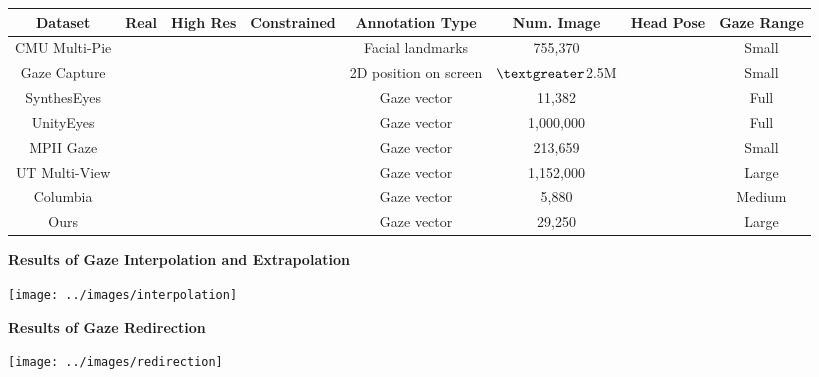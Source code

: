 \documentclass[landscape,a0paper,fontscale=0.292]{baposter}
\newcommand{\ncmark}{\ding{51}}
\newcommand{\nxmark}{\ding{55}}
\begin{document}
\begin{poster}
{\begin{center}
\begin{tabular}{cccccccc}
\toprule
Dataset & Real& High Res& Constrained & Annotation Type & Num. Image &Head Pose &Gaze Range\\
\hline\hline
CMU Multi-Pie &\ncmark&\nxmark&\ncmark &Facial landmarks&755,370 &\ncmark &Small\\
Gaze Capture &\ncmark &\nxmark &\nxmark &2D position on screen &$\textgreater$2.5M &\nxmark &Small\\
SynthesEyes &\nxmark &\ncmark &\nxmark &Gaze vector & 11,382 &\ncmark & Full\\
UnityEyes &\nxmark &\ncmark &\nxmark &Gaze vector &1,000,000 &\ncmark&Full\\
MPII Gaze &\ncmark &\nxmark &\nxmark &Gaze vector &213,659 &\ncmark &Small\\
UT Multi-View &\ncmark &\nxmark &\ncmark &Gaze vector&1,152,000 &\ncmark &Large\\
Columbia &\ncmark &\ncmark &\ncmark &Gaze vector& 5,880 &\ncmark &Medium\\
\hline\hline
Ours&\ncmark &\ncmark &\ncmark &Gaze vector & 29,250 &\ncmark &Large\\
\bottomrule
\end{tabular}
\end{center}
\hfill

\begin{minipage}[t]{0.5\textwidth}
    \textbf{\color{blue}Results of Gaze Interpolation and Extrapolation} 
    \vspace{-0.2em}
    \begin{center}
        \texttt{[image: ../images/interpolation]}
    \end{center}
\end{minipage}
\hfill%
\begin{minipage}[t]{0.5\textwidth}
\textbf{\color{blue}Results of Gaze Redirection} 
    \begin{flushleft}
        \texttt{[image: ../images/redirection]}
    \end{flushleft}
\end{minipage}
}
\end{poster}
\end{document}
